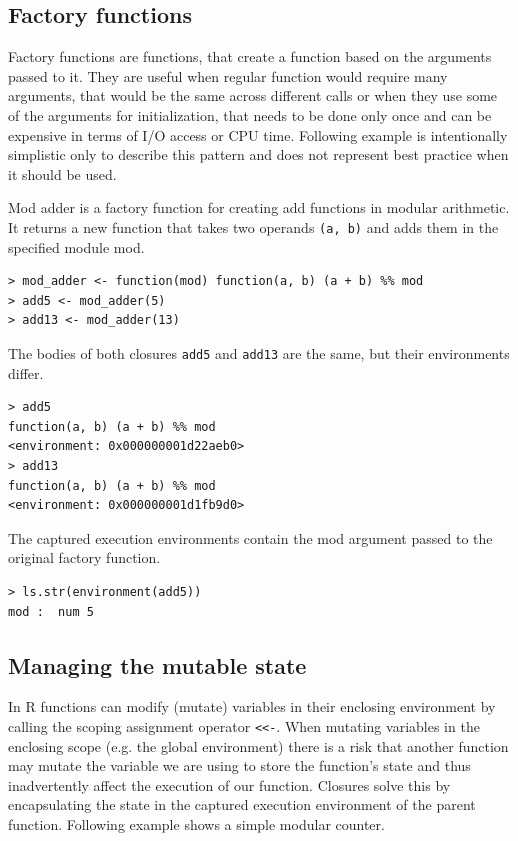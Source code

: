 \documentclass[thesis=B,english]{FITthesis}[2012/10/20]
\begin{document}
\subsection{Factory functions} \label{ssec:clos1}
Factory functions are functions, that create a function based on the arguments passed to it. They are useful when regular function would require many arguments, that would be the same across different calls or when they use some of the arguments for initialization, that needs to be done only once and can be expensive in terms of I/O access or CPU time. Following example is intentionally simplistic only to describe this pattern and does not represent best practice when it should be used.

Mod adder is a factory function for creating add functions in modular arithmetic. It returns a new function that takes two operands \verb|(a, b)| and adds them in the specified module mod.

\begin{verbatim}
> mod_adder <- function(mod) function(a, b) (a + b) %% mod
> add5 <- mod_adder(5)
> add13 <- mod_adder(13)
\end{verbatim}

The bodies of both closures \verb|add5| and \verb|add13| are the same, but their environments differ.

\begin{verbatim}
> add5
function(a, b) (a + b) %% mod
<environment: 0x000000001d22aeb0>
> add13
function(a, b) (a + b) %% mod
<environment: 0x000000001d1fb9d0>
\end{verbatim}

The captured execution environments contain the mod argument passed to the original factory function.

\begin{verbatim}
> ls.str(environment(add5))
mod :  num 5
\end{verbatim}

\subsection{Managing the mutable state} 
In R functions can modify (mutate) variables in their enclosing environment by calling the scoping assignment operator \verb|<<-|. When mutating variables in the enclosing scope (e.g. the global environment) there is a risk that another function may mutate the variable we are using to store the function’s state and thus inadvertently affect the execution of our function. Closures solve this by encapsulating the state in the captured execution environment of the parent function. Following example shows a simple modular counter.
\end{document}
